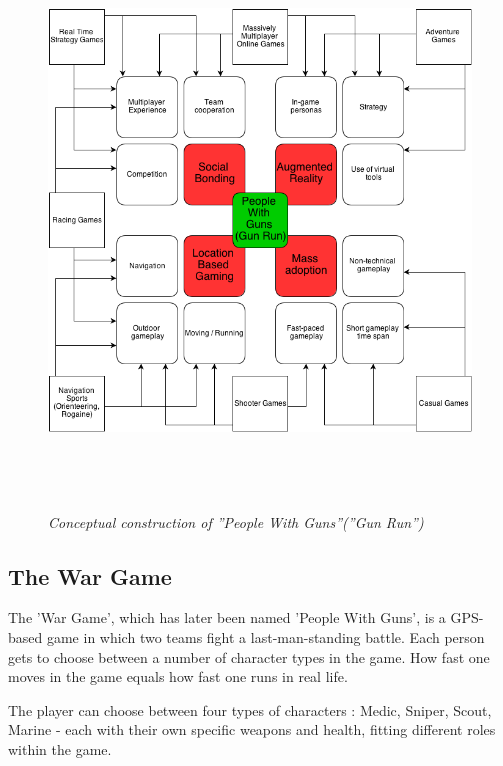 \begin{figure}
\includegraphics[height=6in,width=6in]{./images/diagrams/ConstructionOfPeopleWithGuns.png}
\caption{\small \sl Conceptual construction of ''People With Guns''(''Gun Run'') 
\label{fig:concept_construction}}
\end{figure}



\subsection{The War Game}

The 'War Game', which has later been named 'People With Guns', is a GPS-based
game in which two teams fight a last-man-standing battle. Each person gets to
choose between a number of character types in the game. How fast one moves in
the game equals how fast one runs in real life.\newline

The player can choose between four types of characters : Medic, Sniper, Scout,
Marine - each with their own specific weapons and health, fitting different
roles within the game.\newline


